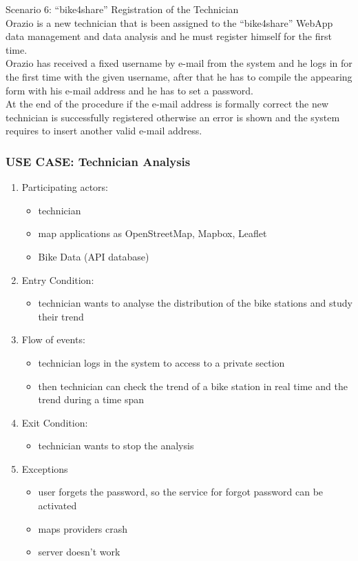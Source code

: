\documentclass{article}
\begin{document}
Scenario 6:  “bike4share” Registration of the Technician \\
Orazio is a new technician that is been assigned to the “bike4share” WebApp data management and data analysis and he must register himself for the first time.\\ 
Orazio has received a fixed username by e-mail from the system and he logs in for the first time with the given username, after that he has to compile the appearing form with his e-mail address and he has to set a password.\\
At the end of the procedure if the e-mail address is formally correct the new technician is successfully registered otherwise an error is shown and the system requires to insert another valid e-mail address. 


\subsubsection{\textbf{USE CASE}: Technician Analysis}
\begin{enumerate}
\item Participating actors: 
\begin{itemize}
    \item technician
    \item map applications as OpenStreetMap, Mapbox, Leaflet
    \item Bike Data (API database)
\end{itemize}
\item Entry Condition: 
\begin{itemize}
    \item technician wants to analyse the distribution of the bike stations and study their trend
\end{itemize}
\item Flow of events: 
\begin{itemize}
    \item technician logs in the system to access to a private section
    \item then technician can check the trend of a bike station in real time and the trend during a time span
\end{itemize}
\item Exit Condition: 
\begin{itemize}
    \item technician wants to stop the analysis
\end{itemize}
\item Exceptions
\begin{itemize}
    \item user forgets the password, so the service for forgot password can be activated
    \item maps providers crash
    \item server doesn’t work
\end{itemize}
\end{enumerate}
\end{document}
